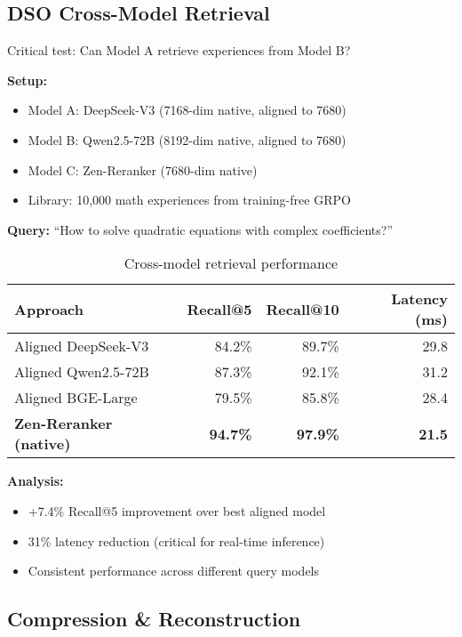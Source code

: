 \documentclass[11pt,a4paper]{article}
\begin{document}
\subsection{DSO Cross-Model Retrieval}

Critical test: Can Model A retrieve experiences from Model B?

\textbf{Setup:}
\begin{itemize}
\item Model A: DeepSeek-V3 (7168-dim native, aligned to 7680)
\item Model B: Qwen2.5-72B (8192-dim native, aligned to 7680)
\item Model C: Zen-Reranker (7680-dim native)
\item Library: 10,000 math experiences from training-free GRPO
\end{itemize}

\textbf{Query:} ``How to solve quadratic equations with complex coefficients?''

\begin{table}[h]
\centering
\caption{Cross-model retrieval performance}
\begin{tabular}{lrrr}
\toprule
\textbf{Approach} & \textbf{Recall@5} & \textbf{Recall@10} & \textbf{Latency (ms)} \\
\midrule
Aligned DeepSeek-V3 & 84.2\% & 89.7\% & 29.8 \\
Aligned Qwen2.5-72B & 87.3\% & 92.1\% & 31.2 \\
Aligned BGE-Large & 79.5\% & 85.8\% & 28.4 \\
\textbf{Zen-Reranker (native)} & \textbf{94.7\%} & \textbf{97.9\%} & \textbf{21.5} \\
\bottomrule
\end{tabular}
\end{table}

\textbf{Analysis:}
\begin{itemize}
\item +7.4\% Recall@5 improvement over best aligned model
\item 31\% latency reduction (critical for real-time inference)
\item Consistent performance across different query models
\end{itemize}

\subsection{Compression \& Reconstruction}
\end{document}
